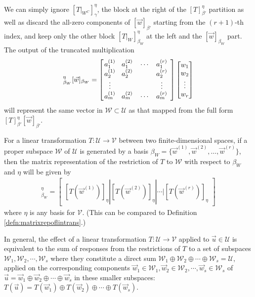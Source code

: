 We can simply ignore $[T|_{W^C}]_\gamma^\eta$, the block at the right of the $[T]_{\beta'}^\eta$ partition as well as discard the all-zero components of $[\vec{w}]_{\beta'}$ starting from the $(r+1)$-th index, and keep only the other block $[T|_{W}]_{\beta_W}^\eta$ at the left and the $[\vec{w}]_{\beta_W}$ part. The output of the truncated multiplication
\begin{align}
[T|_{W}]_{\beta_W}^\eta [\vec{w}]_{\beta_W} = 
\left[\begin{array}{@{\,}wc{15pt}wc{15pt}wc{15pt}wc{15pt}}
a_1^{(1)} & a_1^{(2)} & \cdots & a_1^{(r)} \\
a_2^{(1)} & a_2^{(2)} & & a_2^{(r)} \\
\vdots & & & \vdots \\
a_m^{(1)} & a_m^{(2)} & \cdots & a_m^{(r)} 
\end{array}\right]
\begin{bmatrix}
w_1 \\
w_2 \\
\vdots \\
w_r \\
\end{bmatrix}
\end{align}
will represent the same vector in $\mathcal{W} \subset \mathcal{U}$ as that mapped from the full form $[T]_{\beta'}^\eta[\vec{w}]_{\beta'}$.
\begin{proper}
\label{proper:restrictmat}
For a linear transformation $T: \mathcal{U} \to \mathcal{V}$ between two finite-dimensional spaces, if a proper subspace $\mathcal{W}$ of $\mathcal{U}$ is generated by a basis $\mathcal{\beta}_W = \{\vec{w}^{(1)}, \vec{w}^{(2)}, \ldots, \vec{w}^{(r)}\}$, then the matrix representation of the restriction of $T$ to $\mathcal{W}$ with respect to $\mathcal{\beta}_W$ and $\mathcal{\eta}$ will be given by
\begin{align}
[T|_{W}]_{\beta_W}^\eta = \begin{bmatrix}
[T(\vec{w}^{(1)})]_\eta | [T(\vec{w}^{(2)})]_\eta | \cdots | [T(\vec{w}^{(r)})]_\eta
\end{bmatrix}    
\end{align}
where $\mathcal{\eta}$ is any basis for $\mathcal{V}$. (This can be compared to Definition \ref{defn:matrixrepoflintrans}.)
\end{proper}
In general, the effect of a linear transformation $T: \mathcal{U} \to \mathcal{V}$ applied to $\vec{u} \in \mathcal{U}$ is equivalent to the sum of responses from the restrictions of $T$ to a set of subspaces $\mathcal{W}_1, \mathcal{W}_2, \cdots, \mathcal{W}_s$ where they constitute a direct sum $\mathcal{W}_1 \oplus \mathcal{W}_2 \oplus \cdots \oplus \mathcal{W}_s = \mathcal{U}$, applied on the corresponding components $\vec{w}_1 \in \mathcal{W}_1, \vec{w}_2 \in \mathcal{W}_2, \cdots, \vec{w}_s \in \mathcal{W}_s$ of $\vec{u} = \vec{w}_1 \oplus \vec{w}_2 \oplus \cdots \oplus \vec{w}_s$ in these smaller subspaces: $T(\vec{u}) = T(\vec{w}_1) \oplus T(\vec{w}_2) \oplus \cdots \oplus T(\vec{w}_s)$.

